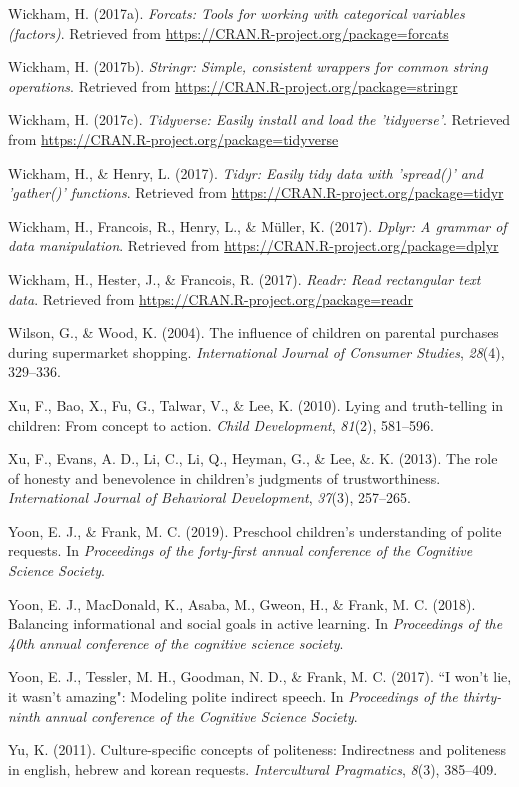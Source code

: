 \documentclass[oneside]{report}
\begin{document}
\hypertarget{ref-R-forcats}{}
Wickham, H. (2017a). \emph{Forcats: Tools for working with categorical
variables (factors)}. Retrieved from
\url{https://CRAN.R-project.org/package=forcats}

\hypertarget{ref-R-stringr}{}
Wickham, H. (2017b). \emph{Stringr: Simple, consistent wrappers for
common string operations}. Retrieved from
\url{https://CRAN.R-project.org/package=stringr}

\hypertarget{ref-R-tidyverse}{}
Wickham, H. (2017c). \emph{Tidyverse: Easily install and load the
'tidyverse'}. Retrieved from
\url{https://CRAN.R-project.org/package=tidyverse}

\hypertarget{ref-R-tidyr}{}
Wickham, H., \& Henry, L. (2017). \emph{Tidyr: Easily tidy data with
'spread()' and 'gather()' functions}. Retrieved from
\url{https://CRAN.R-project.org/package=tidyr}

\hypertarget{ref-R-dplyr}{}
Wickham, H., Francois, R., Henry, L., \& Müller, K. (2017). \emph{Dplyr:
A grammar of data manipulation}. Retrieved from
\url{https://CRAN.R-project.org/package=dplyr}

\hypertarget{ref-R-readr}{}
Wickham, H., Hester, J., \& Francois, R. (2017). \emph{Readr: Read
rectangular text data}. Retrieved from
\url{https://CRAN.R-project.org/package=readr}

\hypertarget{ref-wilson2004}{}
Wilson, G., \& Wood, K. (2004). The influence of children on parental
purchases during supermarket shopping. \emph{International Journal of
Consumer Studies}, \emph{28}(4), 329--336.

\hypertarget{ref-xu2010}{}
Xu, F., Bao, X., Fu, G., Talwar, V., \& Lee, K. (2010). Lying and
truth-telling in children: From concept to action. \emph{Child
Development}, \emph{81}(2), 581--596.

\hypertarget{ref-xu2013}{}
Xu, F., Evans, A. D., Li, C., Li, Q., Heyman, G., \& Lee, \&. K. (2013).
The role of honesty and benevolence in children's judgments of
trustworthiness. \emph{International Journal of Behavioral Development},
\emph{37}(3), 257--265.

\hypertarget{ref-yoon2019}{}
Yoon, E. J., \& Frank, M. C. (2019). Preschool children's understanding
of polite requests. In \emph{Proceedings of the forty-first annual
conference of the Cognitive Science Society}.

\hypertarget{ref-yoon2018balancing}{}
Yoon, E. J., MacDonald, K., Asaba, M., Gweon, H., \& Frank, M. C.
(2018). Balancing informational and social goals in active learning. In
\emph{Proceedings of the 40th annual conference of the cognitive science
society}.

\hypertarget{ref-yoon2017}{}
Yoon, E. J., Tessler, M. H., Goodman, N. D., \& Frank, M. C. (2017). ``I
won't lie, it wasn't amazing": Modeling polite indirect speech. In
\emph{Proceedings of the thirty-ninth annual conference of the Cognitive
Science Society}.

\hypertarget{ref-yu2011}{}
Yu, K. (2011). Culture-specific concepts of politeness: Indirectness and
politeness in english, hebrew and korean requests. \emph{Intercultural
Pragmatics}, \emph{8}(3), 385--409.


\end{document}
